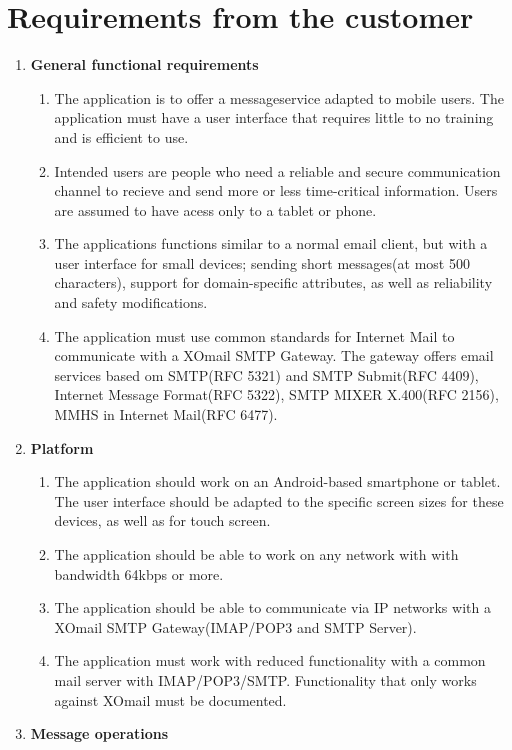 

\section{Requirements from the customer}

\begin{enumerate}
\item{} \textbf{General functional requirements}
\begin{enumerate}
\item{}The application is to offer a messageservice adapted to mobile users. The application must have a user interface that requires little to no training and is efficient to use.
\item{}Intended users are people who need a reliable and secure communication channel to recieve and send more or less time-critical information. Users are assumed to have acess only to a tablet or phone.
\item{}The applications functions similar to a normal email client, but with a user interface for small devices; sending short messages(at most 500 characters), support for domain-specific attributes, as well as reliability and safety modifications.
\item{}The application must use common standards for Internet Mail to communicate with a XOmail SMTP Gateway. The gateway offers email services based om SMTP(RFC 5321) and SMTP Submit(RFC 4409), Internet Message Format(RFC 5322), SMTP MIXER X.400(RFC 2156), MMHS in Internet Mail(RFC 6477).
\end{enumerate}
\item{}\textbf{Platform}
\begin{enumerate}
\item{}The application should work on an Android-based smartphone or tablet. The user interface should be adapted to the specific screen sizes for these devices, as well as for touch screen.
\item{}The application should be able to work on any network with with bandwidth 64kbps or more.
\item{}The application should be able to communicate via IP networks with a XOmail SMTP Gateway(IMAP/POP3 and SMTP Server).
\item{}The application must work with reduced functionality with a common mail server with IMAP/POP3/SMTP. Functionality that only works against XOmail must be documented.
\end{enumerate}
\item{}\textbf{Message operations}

\end{enumerate}
